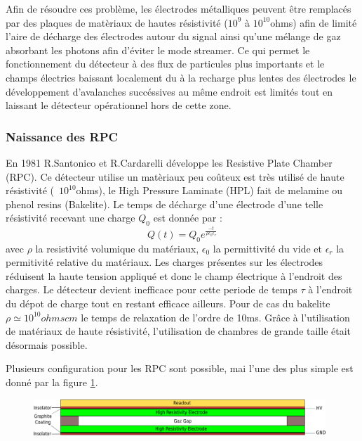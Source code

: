 Afin de résoudre ces problème, les électrodes métalliques peuvent être remplacés par des plaques de matèriaux de hautes résistivité ($10^{9}$ à $10^{10}$ohms) afin de limité l'aire de décharge des électrodes autour du signal ainsi qu'une mélange de gaz absorbant les photons afin d'éviter le mode streamer. Ce qui permet le fonctionnement du détecteur à des flux de particules plus importants et le champs électrics baissant localement du à la recharge plus lentes des électrodes le développement d'avalanches succéssives au même endroit est limités tout en laissant le détecteur opérationnel hors de cette zone.

\subsubsection{Naissance des RPC}
En 1981 R.Santonico et R.Cardarelli développe les Resistive Plate Chamber (RPC). Ce détecteur utilise un matèriaux peu coûteux est très utilisé de haute résistivité (~$10^{10}$ohms), le High Pressure Laminate (HPL) fait de melamine ou phenol resins (Bakelite). Le temps de décharge d'une électrode d'une telle résistivité recevant une charge $Q_{0}$ est donnée par :
\begin{equation}
Q(t)=Q_{0}e^{\frac{-t}{\rho\epsilon_{0}\epsilon_{r}}}
\end{equation}
avec $\rho$ la resistivité volumique du matériaux, $\epsilon_{0}$ la permittivité du vide et $\epsilon_{r}$ la permitivité relative du matériaux.
Les charges présentes sur les électrodes réduisent la haute tension appliqué et donc le champ électrique à l'endroit des charges. Le détecteur devient inefficace pour cette periode de temps $\tau$ à l'endroit du dépot de charge tout en restant efficace ailleurs. Pour de cas du bakelite $\rho\simeq10^{10}ohmscm$ le temps de relaxation de l'ordre de 10ms. Grâce à l'utilisation de matériaux de haute résistivité, l'utilisation de chambres de grande taille était désormais possible.

Plusieurs configuration pour les RPC sont possible, mai l'une des plus simple est donné par la figure \ref{RPCscheme}.

\begin{figure}[h!]
	\centering
	\includegraphics[width=0.98\textwidth]{RPC/scheme_first.png}
	\label{RPCscheme}
\end{figure}

